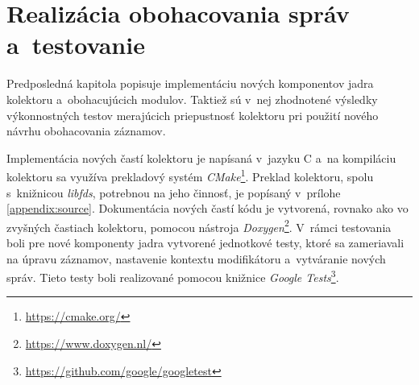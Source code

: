 
\chapter{Realizácia obohacovania správ a~testovanie}
\label{chpt:implementacia}

Predposledná kapitola popisuje implementáciu nových komponentov jadra kolektoru a~obohacujúcich modulov. Taktiež sú v~nej zhodnotené výsledky výkonnostných testov merajúcich priepustnosť kolektoru pri použití nového návrhu obohacovania záznamov.

Implementácia nových častí kolektoru je napísaná v~jazyku C a~na kompiláciu kolektoru sa využíva prekladový systém \textit{CMake}\footnote{\url{https://cmake.org/}}. Preklad kolektoru, spolu s~knižnicou \textit{libfds}, potrebnou na jeho činnosť, je popísaný v~prílohe \ref{appendix:source}.
Dokumentácia nových častí kódu je vytvorená, rovnako ako vo zvyšných častiach kolektoru, pomocou nástroja \textit{Doxygen}\footnote{\url{https://www.doxygen.nl/}}. V~rámci testovania boli pre nové komponenty jadra vytvorené jednotkové testy, ktoré sa zameriavali na úpravu
záznamov, nastavenie kontextu modifikátoru a~vytváranie nových správ. Tieto testy boli realizované pomocou knižnice \textit{Google Tests}\footnote{\url{https://github.com/google/googletest}}.


